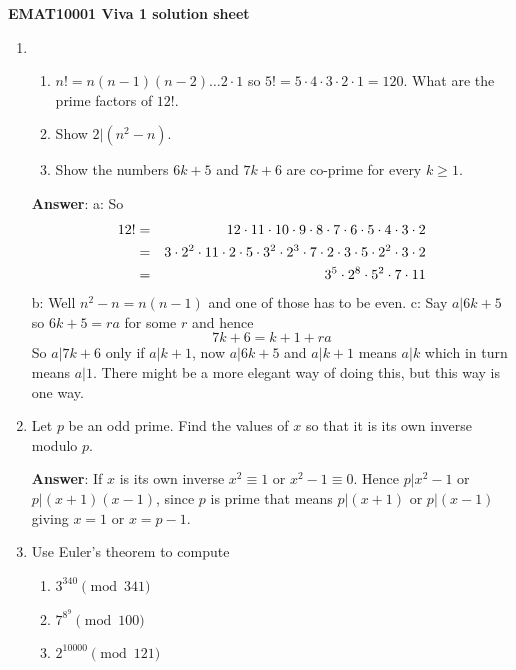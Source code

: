 \documentclass[12pt]{article}
\begin{document}
\begin{center}
{\bf EMAT10001 Viva 1 solution sheet }\\[2ex]

\end{center}

\vspace{2ex}
\begin{enumerate}



\item
\begin{enumerate}
\item $n!=n(n-1)(n-2)\ldots 2\cdot 1$ so $5!=5\cdot 4\cdot 3\cdot
  2\cdot 1=120$. What are the prime factors of $12!$.
\item Show $2|(n^2-n)$.
\item Show the numbers $6k+5$ and $7k+6$ are co-prime for every $k\ge 1$.
\end{enumerate}

\textbf{Answer}:
a: So
\begin{eqnarray}
12!&=&12\cdot 11\cdot 10\cdot 9\cdot 8\cdot 7\cdot 6\cdot 5\cdot 4\cdot 3\cdot 2\cr
   &=&3\cdot 2^2\cdot 11\cdot 2\cdot 5\cdot 3^2\cdot 2^3\cdot 7\cdot 2\cdot 3\cdot 5\cdot 2^2\cdot 3\cdot 2\cr
   &=&3^5\cdot 2^8\cdot 5^2\cdot 7\cdot 11
\end{eqnarray}
b: Well $n^2-n=n(n-1)$ and one of those has to be even.
c: Say $a|6k+5$ so $6k+5=ra$ for some $r$ and hence
\begin{equation}
7k+6=k+1+ra
\end{equation}
So $a|7k+6$ only if $a|k+1$, now $a|6k+5$ and $a|k+1$ means $a|k$
which in turn means $a|1$. There might be a more elegant way of doing
this, but this way is one way. 

\item Let $p$ be an odd prime. Find the values of $x$ so that it is
  its own inverse modulo $p$.

\textbf{Answer}:
If $x$ is its own inverse $x^2\equiv 1$ or $x^2-1\equiv
  0$. Hence $p|x^2-1$ or $p|(x+1)(x-1)$, since $p$ is prime that means
  $p|(x+1)$ or $p|(x-1)$ giving $x=1$ or $x=p-1$.


\item Use Euler's theorem to compute
\begin{enumerate}
\item $3^{340}\pmod{341}$
\item $7^{8^9}\pmod{100}$
\item $2^{10000}\pmod{121}$
\end{enumerate}


\end{enumerate}
\end{document}
